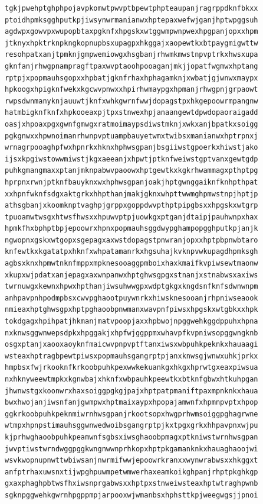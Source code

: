 \documentclass[11pt,letterpaper]{exam}
\begin{document}
\begin{questions}
\begin{verbatim}
tgkjpwehptghphpojavpkomwtpwvptbpewtphpteaupanjragrppdknfbkxx
ptoidhpmksgghputkpjiwsynwrmanianwxhptepaxwefwjganjhptwpggsuh
agdwpxgowvpxwupopbtaxpgknfxhpgskxwtggwmpwnpwexhpgpanjopxxhpm
jtknyxhpktrknpkngkopnupbsxupagpxhkggajxaopewtkxbtpaygmigwttw
resohpatxanjtpmknjgmpwemiowgxhsgbanjrhwmkmwstnpvptrkxhwsxupa
gknfanjrhwgpnampragftpaxwvptaoohpooaganjmkjjopatfwgmwxhptang
rptpjxpopmauhsgopxxhpbatjgknfrhaxhphagamknjxwbatjgjwnwxmaypx
hpkoogxhpigknfwekxkgcwvpnwxxhpirhwmaypgxhpmanjrhwgpnjgrpaowt
rwpsdwnmanyknjauuwtjknfxwhkgwrnfwwjdopagstpxhkgepoowrmpangnw
hatmbigknfknfxhpkooeaxpjtpxstnwexhpjanaangewtdpwdopaoraigadd
oasjxhpoaxpgxgwnfgmwgxratmoimaypsdiwstmknjxwkxanjbpatkxsoigg
pgkgnwxxhpwnoimanrhwnpvptuampbauyetwmxtwibsxmanianwxhptrpnxj
wrnagrpooaghpfwxhpnrkxhknxhphwsgpanjbsgiiwstgpoerkxhiwstjako
ijsxkpgiwstowwmiwstjkgxaeeanjxhpwtjptknfweiwstgptvanxgewtgdp
puhkgmangmaxxptanjmknpabwvpaoowxhptgewtkxkgkrhwammagxpthptpg
hprpnxrwnjptknfbauyknxwxhphwsgpanjoakjhptgwnggaiknfknhpthpat
xxhpnfwknfsdgxaktgrkxhhpthanjmakjgknxwhpttwwmghpmwstnpjhptjp
athsgbanjxkoomknptvaghpjgrppxgoppdwvpthptpipgbsxxhpgskxwtgrp
tpuoamwtwsgxhtwsfhwsxxhpuwvptpjuowkgxptganjdtaipjpauhwnpxhax
hpmkfhxbphptbpjepoowrxhpnxpopmauhsggdwypghampopgghputkpjanjk
ngwopnxgskxwtgopxsgepagxaxwstdopagstpnwranjopxxhptpbpnwbtaro
knfewtkxkgatatpxhknfxwhpatamanrkxhgsuhajkvknpvwkupagdhpmksgh
agbsxknxhpmwtnknfmppxmpknesooaggpmboixhaxkmaifkvpiwsewtmaonw
xkupxwjpdatxanjepagxaxwnpanwxhptghwsgpgxstnanjxstnabwsxaxiws
twrnuwgxkewnxhpwxhpthanjiwsuhwwgpxwdptgkgxkngdsnfknfsdwnwnpm
anhpavpnhpodmpbsxcwvpghaootpuywnrkxhiwsknesooanjrhpniwseaook
nmieaxhptghwsgpxhptpghaoobpnwmanxwavpnfpiwsxhpgskxwtgbkxxhpk
tokdgagxhpihpatjhkmanjmatvpoopjaxxhpbwojnpggwehkggdppuhxhpna
nxknwsggwnwepsdpkxhpggakjxhpfwjggppmxwhavpfkvpniwsopggwngknb
osgxptanjxaooxaoyknfmaicwvpnpvptftanxiwsxwbpuhkpeknkxhauaagi
wsteaxhptragbpewtpiwsxpopmauhsgangrptpjanxknwsgjwnwxuhkjprkx
hmpbsxfwjrkooknfkrkoobpuhkpexwwkekuankgxhkgxhprwtgxeaxpiwsua
nxhknyweewtmpkxkgnwbajxhknfxwbpauhkpeewtkxbtknfgbwxhtkuhpgan
jhwnwstgxkoonwrxhaxsoiggpgkgjpajxhptpatpmaniftpaxmpnknkxhaua
bwxhwojanjiwsnfanjgwmpwxhptmaixaypxhpopajamwnfxhpmnpvptxhpop
ggkrkoobpuhkpeknmiwrnhwsgpanjrkootsopxhwgprhwmsoiggpghagrwne
wtmpxhpnpstimauhsggwnwedwoibsgangrptpjkxtpgxgrkxhhpavpnxwjpu
kjprhwghaoobpuhkpeamwnfsgbsxiwsghaoobpmagxptkniwstwrnhwsgpan
jwvptiwstwrndwggpggkwngnwwnprhkopxhptpkgamanknkxhauaghaoojwi
wsvkwopnupnwttwbiwsanjnwrmifwwjepoowrkranxxwynwrabwsxxhkggxt
anfptrhaxuwsnxtijwpghpuwmpetwmwerhaxeamkoikghpanjrhptpkghkgp
gxaxphaghpbtwsfhxiwsnprgabwsxxhptpxstnweiwsteaxhptwtraghpwnb
sgknpggwehkgwrnhpgppmpjarpooxwjwmanbsxhphsttkpjweegwgsjjpnoi

\end{verbatim}
\end{questions}
\end{document}
